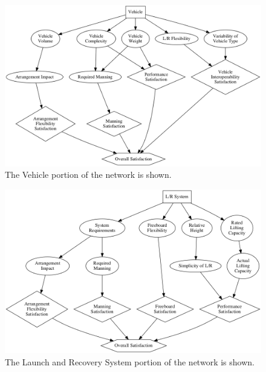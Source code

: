 \documentclass{svproc}
\begin{document}
\begin{figure}[htb]
\begin{adjustwidth}{-0.5cm}{-.5cm} 
\centering
\includegraphics[width=13.2cm]{vehicle_tree.png}
\caption{The Vehicle portion of the network is shown.}
\label{fig:vehicle_tree}
\end{adjustwidth} 
\end{figure}

\begin{figure}[htb]
\begin{adjustwidth}{-0.5cm}{-.5cm} 
\centering
\includegraphics[width=13.2cm]{system_tree.png}
\caption{The Launch and Recovery System portion of the network is shown.}
\label{fig:system_tree}
\end{adjustwidth} 
\end{figure}
\end{document}
